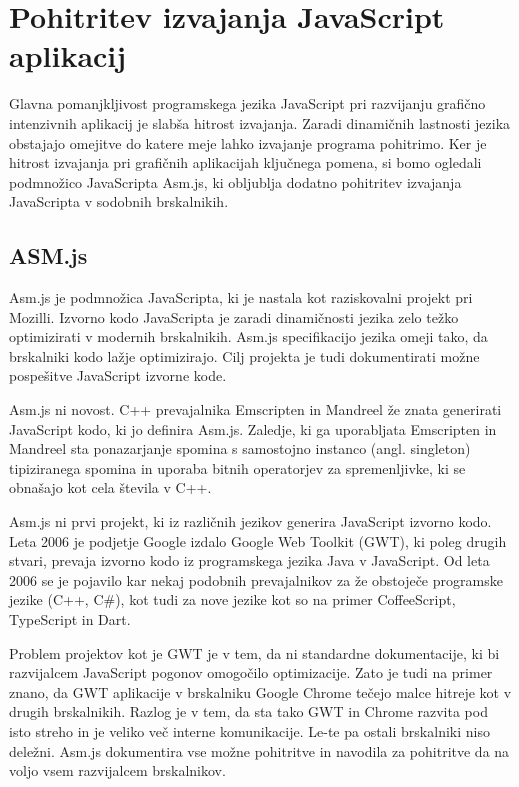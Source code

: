 \chapter{Pohitritev izvajanja JavaScript aplikacij}
\label{sec:asm}
Glavna pomanjkljivost programskega jezika JavaScript pri razvijanju grafično intenzivnih aplikacij je slabša hitrost izvajanja. Zaradi dinamičnih lastnosti jezika obstajajo omejitve do katere meje lahko izvajanje programa pohitrimo. Ker je hitrost izvajanja pri grafičnih aplikacijah ključnega pomena, si bomo ogledali podmnožico JavaScripta Asm.js, ki obljublja dodatno pohitritev izvajanja JavaScripta v sodobnih brskalnikih.

\section{ASM.js}

Asm.js \cite{asm} je podmnožica JavaScripta, ki je nastala kot raziskovalni projekt pri Mozilli. Izvorno kodo JavaScripta je zaradi dinamičnosti jezika zelo težko optimizirati v modernih brskalnikih. Asm.js specifikacijo jezika omeji tako, da brskalniki kodo lažje optimizirajo. Cilj projekta je tudi dokumentirati možne pospešitve JavaScript izvorne kode.

Asm.js ni novost. C++ prevajalnika Emscripten in Mandreel že znata generirati JavaScript kodo, ki jo definira Asm.js. Zaledje, ki ga uporabljata Emscripten in Mandreel sta ponazarjanje spomina s samostojno instanco (angl. singleton) tipiziranega spomina in uporaba bitnih operatorjev za spremenljivke, ki se obnašajo kot cela števila v C++.

Asm.js ni prvi projekt, ki iz različnih jezikov generira JavaScript izvorno kodo. Leta 2006 je podjetje Google izdalo Google Web Toolkit (GWT), ki poleg drugih stvari, prevaja izvorno kodo iz programskega jezika Java v JavaScript. Od leta 2006 se je pojavilo kar nekaj podobnih prevajalnikov za že obstoječe programske jezike (C++, C\#), kot tudi za nove jezike kot so na primer CoffeeScript, TypeScript in Dart.

Problem projektov kot je GWT je v tem, da ni standardne dokumentacije, ki bi razvijalcem JavaScript pogonov omogočilo optimizacije. Zato je tudi na primer znano, da GWT aplikacije v brskalniku Google Chrome tečejo malce hitreje kot v drugih brskalnikih. Razlog je v tem, da sta tako GWT in Chrome razvita pod isto streho in je veliko več interne komunikacije. Le-te pa ostali brskalniki niso deležni. Asm.js dokumentira vse možne pohitritve in navodila za pohitritve da na voljo vsem razvijalcem brskalnikov.

